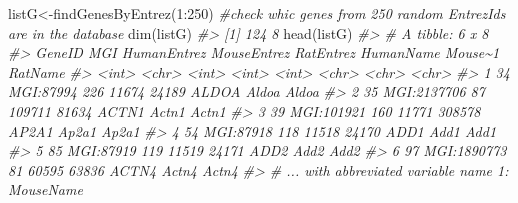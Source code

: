 \documentclass[
]{article}
\newenvironment{Shaded}{\begin{snugshade}}{\end{snugshade}}
\newcommand{\CommentTok}[1]{\textcolor[rgb]{0.56,0.35,0.01}{\textit{#1}}}
\newcommand{\DecValTok}[1]{\textcolor[rgb]{0.00,0.00,0.81}{#1}}
\newcommand{\FunctionTok}[1]{\textcolor[rgb]{0.00,0.00,0.00}{#1}}
\newcommand{\NormalTok}[1]{#1}
\newcommand{\OtherTok}[1]{\textcolor[rgb]{0.56,0.35,0.01}{#1}}
\newcommand{\SpecialCharTok}[1]{\textcolor[rgb]{0.00,0.00,0.00}{#1}}
\begin{document}
\begin{Shaded}
\begin{Highlighting}[]

\NormalTok{listG}\OtherTok{\textless{}{-}}\FunctionTok{findGenesByEntrez}\NormalTok{(}\DecValTok{1}\SpecialCharTok{:}\DecValTok{250}\NormalTok{) }\CommentTok{\#check whic genes from 250 random EntrezIds are in the database}
\FunctionTok{dim}\NormalTok{(listG)}
\CommentTok{\#\textgreater{} [1] 124   8}
\FunctionTok{head}\NormalTok{(listG)}
\CommentTok{\#\textgreater{} \# A tibble: 6 x 8}
\CommentTok{\#\textgreater{}   GeneID MGI         HumanEntrez MouseEntrez RatEntrez HumanName Mouse\textasciitilde{}1 RatName}
\CommentTok{\#\textgreater{}    \textless{}int\textgreater{} \textless{}chr\textgreater{}             \textless{}int\textgreater{}       \textless{}int\textgreater{}     \textless{}int\textgreater{} \textless{}chr\textgreater{}     \textless{}chr\textgreater{}   \textless{}chr\textgreater{}  }
\CommentTok{\#\textgreater{} 1     34 MGI:87994           226       11674     24189 ALDOA     Aldoa   Aldoa  }
\CommentTok{\#\textgreater{} 2     35 MGI:2137706          87      109711     81634 ACTN1     Actn1   Actn1  }
\CommentTok{\#\textgreater{} 3     39 MGI:101921          160       11771    308578 AP2A1     Ap2a1   Ap2a1  }
\CommentTok{\#\textgreater{} 4     54 MGI:87918           118       11518     24170 ADD1      Add1    Add1   }
\CommentTok{\#\textgreater{} 5     85 MGI:87919           119       11519     24171 ADD2      Add2    Add2   }
\CommentTok{\#\textgreater{} 6     97 MGI:1890773          81       60595     63836 ACTN4     Actn4   Actn4  }
\CommentTok{\#\textgreater{} \# ... with abbreviated variable name 1: MouseName}


\end{Highlighting}
\end{Shaded}
\end{document}
